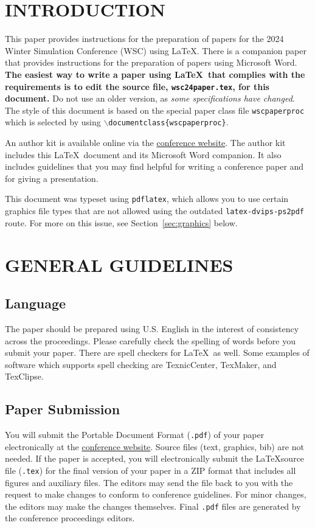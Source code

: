 \documentclass{wscpaperproc}
\theoremstyle{wsc}
\begin{document}
\section{INTRODUCTION}
\label{sec:intro}

This paper provides instructions for the preparation of papers for the 2024
Winter Simulation Conference (WSC) using \LaTeX. There is a companion paper that
provides instructions for the preparation of papers using Microsoft Word. \textbf{The easiest way to write a paper using \LaTeX\ that complies with the
requirements is to edit the source file, {\tt wsc24paper.tex}, for this document.}
Do not use an older version, as \textit{some specifications have changed}.
The style of this document is based on the special paper class file {\tt wscpaperproc} which is selected by using {\tt $\backslash$documentclass\{wscpaperproc\}}.

An author kit is available online via the \href{http://www.wintersim.org}%
{conference website}.
The author kit includes this \LaTeX\ document and its Microsoft Word companion.
It also includes guidelines that you may find helpful for writing a conference paper and for giving a presentation.

This document was typeset using {\tt pdflatex}, which allows you to use certain
graphics file types that are not allowed using the outdated {\tt latex-dvips-ps2pdf} route.
For more on this issue, see Section~\ref{sec:graphics} below.

\section{GENERAL GUIDELINES}

\subsection{Language}
The paper should be prepared using U.S. English in the interest of consistency across the proceedings. Please carefully check the spelling of words before you submit your paper. There are spell checkers for \LaTeX\ as well.
Some examples of software which supports spell checking are TexnicCenter, TexMaker, and TexClipse.

\subsection{Paper Submission}
You will submit the Portable Document Format ({\tt .pdf}) of your paper electronically at the \href{http://www.wintersim.org}{conference website}. Source files (text, graphics, bib) are not needed. If the paper is accepted, you will electronically submit the \LaTeX source file ({\tt .tex}) for the final version of your paper in a ZIP format that includes all figures and auxiliary files.
The editors may send the file back to you with the request to make changes to conform to conference guidelines. For minor changes, the editors may make the changes themselves. Final {\tt .pdf} files are generated by the conference proceedings editors.
\end{document}
